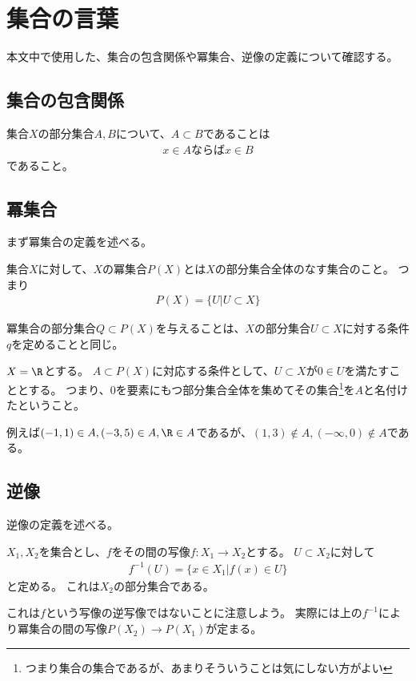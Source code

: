 \documentclass[uplatex]{jsarticle}
\begin{document}
\section{集合の言葉}
本文中で使用した、集合の包含関係や冪集合、逆像の定義について確認する。

\subsection{集合の包含関係}
集合$X$の部分集合$A, B$について、$A\subset B$であることは
\begin{align*}
  x\in A\mbox{ならば}x\in B
\end{align*}
であること。

\subsection{冪集合}
まず冪集合の定義を述べる。
\begin{dfn}[冪集合]
  集合$X$に対して、$X$の冪集合$P(X)$とは$X$の部分集合全体のなす集合のこと。
  つまり
  \begin{align*}
    P(X)=\{U\vert U\subset X\}
  \end{align*}
\end{dfn}

冪集合の部分集合$Q\subset P(X)$を与えることは、$X$の部分集合$U\subset X$に対する条件$q$を定めることと同じ。

\begin{eg}
  $X=\R$とする。
  $A\subset P(X)$に対応する条件として、$U\subset X$が$0\in U$を満たすこととする。
  つまり、$0$を要素にもつ部分集合全体を集めてその集合\footnote{つまり集合の集合であるが、あまりそういうことは気にしない方がよい}を$A$と名付けたということ。

  例えば$(-1,1)\in A, (-3,5)\in A, \R\in A$であるが、$(1,3)\notin A, (-\infty,0)\notin A$である。
\end{eg}

\subsection{逆像}

逆像の定義を述べる。
\begin{dfn}[写像による部分集合の逆像]
  $X_1, X_2$を集合とし、$f$をその間の写像$f:X_1 \to X_2$とする。
  $U\subset X_2$に対して
  \begin{align*}
    f^{-1}(U)=\{x\in X_1\vert f(x)\in U\}
  \end{align*}
  と定める。
  これは$X_2$の部分集合である。
\end{dfn}
 
これは$f$という写像の逆写像ではないことに注意しよう。
実際には上の$f^{-1}$により冪集合の間の写像$P(X_2)\to P(X_1)$が定まる。




\end{document}
